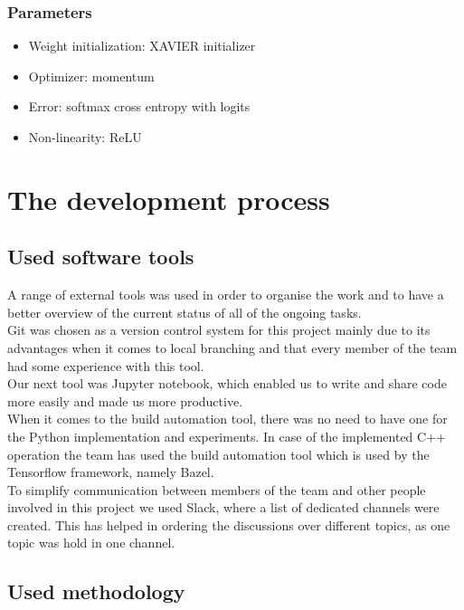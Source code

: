 \documentclass[licencjacka]{pracamgr}
\begin{document}
		\subsection{Parameters}
			\begin{itemize}
 			\item Weight initialization: XAVIER initializer
 			\item Optimizer: momentum 
 			\item Error: softmax cross entropy with logits
 			\item Non-linearity: ReLU
			\end{itemize}

\chapter{The development process}

	\section{Used software tools}
	A range of external tools was used in order to organise the work and to have a better overview of the current status of all of the ongoing tasks.
\\
	Git was chosen as a version control system for this project mainly due to its advantages when it comes to local branching and that every member of the team had some experience with this tool.
\\
	Our next tool was Jupyter notebook, which enabled us to write and share code more easily and made us more productive. 
\\
	When it comes to the build automation tool, there was no need to have one for the Python implementation and experiments. In case of the implemented C++ operation the team has used the build automation tool which is used by the Tensorflow framework, namely Bazel.	
\\
	To simplify communication between members of the team and other people involved in this project we used Slack, where a list of dedicated channels were created. This has helped in ordering the discussions over different topics, as one topic was hold in one channel.

	\section{Used methodology}
\end{document}
